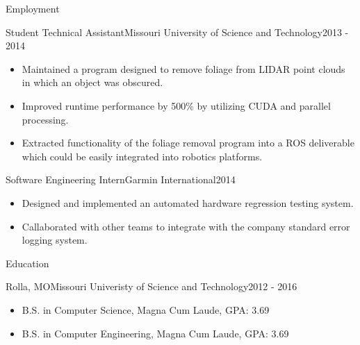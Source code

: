 \documentclass[]{mcdowellcv}
\begin{document}
\begin{cvsection}{Employment}
        \begin{cvsubsection}[2]{Student Technical Assistant}{Missouri University of Science and Technology}{2013 - 2014}		
			\begin{itemize}
                \item Maintained a program designed to remove foliage from LIDAR point clouds in which an object was obscured.
                \item Improved runtime performance by 500\% by utilizing CUDA and parallel processing.
                \item Extracted functionality of the foliage removal program into a ROS deliverable which could be easily integrated into robotics platforms.
			\end{itemize}
		\end{cvsubsection}
		
        \begin{cvsubsection}{Software Engineering Intern}{Garmin International}{2014}	
			\begin{itemize}
			    \item Designed and implemented an automated hardware regression testing system.
                \item Callaborated with other teams to integrate with the company standard error logging system.
			\end{itemize}
		\end{cvsubsection}

        \iffalse
        \begin{vijon}
        \begin{cvsubsection}{Information Systems Intern}{Vi-Jon, Inc.}{2013}
            \begin{itemize}
                \item Designed and developed an application to track supplies in the department.
                \item Streamlined the process for ordering and maintaining supplies to save help desk employees around four hours a week.
            \end{itemize}
        \end{cvsubsection}
        \end{vijon}
        \fi

	\end{cvsection}
	
	\begin{cvsection}{Education}
        \begin{cvsubsection}[2]{Rolla, MO}{Missouri Univeristy of Science and Technology}{2012 - 2016}
			\begin{itemize}
				\item B.S. in Computer Science, Magna Cum Laude, GPA: 3.69
                \item B.S. in Computer Engineering, Magna Cum Laude, GPA: 3.69
			\end{itemize}
		\end{cvsubsection}
	\end{cvsection}	
	
\end{document}
